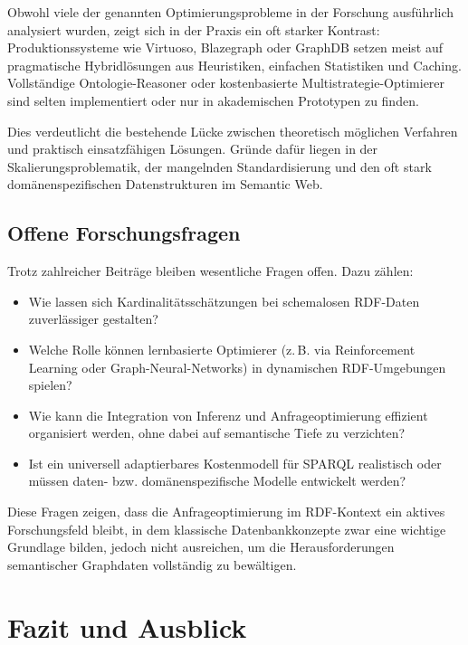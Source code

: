 \documentclass[12pt]{article}
\begin{document}
Obwohl viele der genannten Optimierungsprobleme in der Forschung ausführlich analysiert wurden, zeigt sich in der Praxis ein oft starker Kontrast: Produktionssysteme wie Virtuoso, Blazegraph oder GraphDB setzen meist auf pragmatische Hybridlösungen aus Heuristiken, einfachen Statistiken und Caching. Vollständige Ontologie-Reasoner oder kostenbasierte Multistrategie-Optimierer sind selten implementiert oder nur in akademischen Prototypen zu finden.

Dies verdeutlicht die bestehende Lücke zwischen theoretisch möglichen Verfahren und praktisch einsatzfähigen Lösungen. Gründe dafür liegen in der Skalierungsproblematik, der mangelnden Standardisierung und den oft stark domänenspezifischen Datenstrukturen im Semantic Web.

\subsection{Offene Forschungsfragen}

Trotz zahlreicher Beiträge bleiben wesentliche Fragen offen. Dazu zählen:
\begin{itemize}
    \item Wie lassen sich Kardinalitätsschätzungen bei schemalosen RDF-Daten zuverlässiger gestalten?
    \item Welche Rolle können lernbasierte Optimierer (z.\,B. via Reinforcement Learning oder Graph-Neural-Networks) in dynamischen RDF-Umgebungen spielen?
    \item Wie kann die Integration von Inferenz und Anfrageoptimierung effizient organisiert werden, ohne dabei auf semantische Tiefe zu verzichten?
    \item Ist ein universell adaptierbares Kostenmodell für SPARQL realistisch oder müssen daten- bzw. domänenspezifische Modelle entwickelt werden?
\end{itemize}

Diese Fragen zeigen, dass die Anfrageoptimierung im RDF-Kontext ein aktives Forschungsfeld bleibt, in dem klassische Datenbankkonzepte zwar eine wichtige Grundlage bilden, jedoch nicht ausreichen, um die Herausforderungen semantischer Graphdaten vollständig zu bewältigen.


\section{Fazit und Ausblick} \label{sec:fazit}
\end{document}

